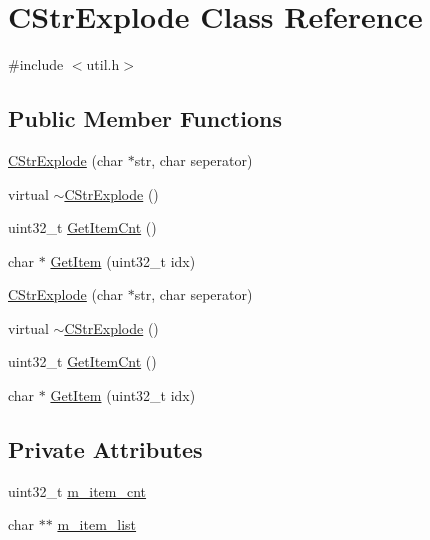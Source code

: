 \hypertarget{class_c_str_explode}{}\section{C\+Str\+Explode Class Reference}
\label{class_c_str_explode}


{\ttfamily \#include $<$util.\+h$>$}

\subsection*{Public Member Functions}
\begin{DoxyCompactItemize}
\item 
\hyperlink{class_c_str_explode_a9d3868b46311766b250feba36b7e8b5a}{C\+Str\+Explode} (char $\ast$str, char seperator)
\item 
virtual \hyperlink{class_c_str_explode_a970098d8a120f58759b4b01ba7c6e38f}{$\sim$\+C\+Str\+Explode} ()
\item 
uint32\+\_\+t \hyperlink{class_c_str_explode_abe86f169c4282aeb4417108cdef09298}{Get\+Item\+Cnt} ()
\item 
char $\ast$ \hyperlink{class_c_str_explode_abb1c1bf20ba636dee8fd099e3007e9d3}{Get\+Item} (uint32\+\_\+t idx)
\item 
\hyperlink{class_c_str_explode_a9d3868b46311766b250feba36b7e8b5a}{C\+Str\+Explode} (char $\ast$str, char seperator)
\item 
virtual \hyperlink{class_c_str_explode_a00dee8ff7dccf0a7484516e2bdcfd575}{$\sim$\+C\+Str\+Explode} ()
\item 
uint32\+\_\+t \hyperlink{class_c_str_explode_abe86f169c4282aeb4417108cdef09298}{Get\+Item\+Cnt} ()
\item 
char $\ast$ \hyperlink{class_c_str_explode_abb1c1bf20ba636dee8fd099e3007e9d3}{Get\+Item} (uint32\+\_\+t idx)
\end{DoxyCompactItemize}
\subsection*{Private Attributes}
\begin{DoxyCompactItemize}
\item 
uint32\+\_\+t \hyperlink{class_c_str_explode_a7dbba0556f62fd1d861444fd88d4bbb9}{m\+\_\+item\+\_\+cnt}
\item 
char $\ast$$\ast$ \hyperlink{class_c_str_explode_a39062e747323ff4e0c37ebafebf943e9}{m\+\_\+item\+\_\+list}
\end{DoxyCompactItemize}


